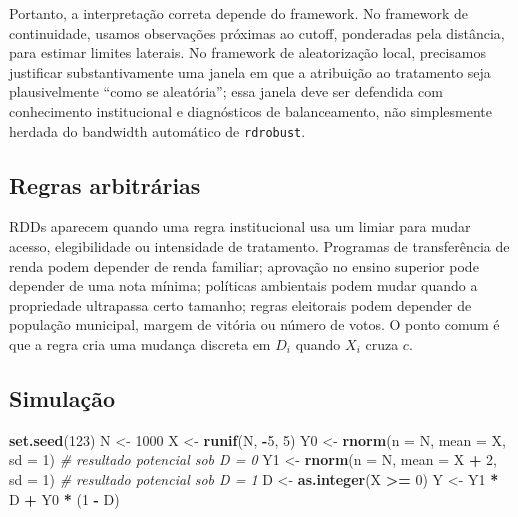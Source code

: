 \documentclass[
]{article}
\newenvironment{Shaded}{\begin{snugshade}}{\end{snugshade}}
\newcommand{\AttributeTok}[1]{\textcolor[rgb]{0.13,0.29,0.53}{#1}}
\newcommand{\CommentTok}[1]{\textcolor[rgb]{0.56,0.35,0.01}{\textit{#1}}}
\newcommand{\DecValTok}[1]{\textcolor[rgb]{0.00,0.00,0.81}{#1}}
\newcommand{\FunctionTok}[1]{\textcolor[rgb]{0.13,0.29,0.53}{\textbf{#1}}}
\newcommand{\NormalTok}[1]{#1}
\newcommand{\OtherTok}[1]{\textcolor[rgb]{0.56,0.35,0.01}{#1}}
\newcommand{\SpecialCharTok}[1]{\textcolor[rgb]{0.81,0.36,0.00}{\textbf{#1}}}
\begin{document}
Portanto, a interpretação correta depende do framework. No framework de continuidade, usamos observações próximas ao cutoff, ponderadas pela distância, para estimar limites laterais. No framework de aleatorização local, precisamos justificar substantivamente uma janela em que a atribuição ao tratamento seja plausivelmente ``como se aleatória''; essa janela deve ser defendida com conhecimento institucional e diagnósticos de balanceamento, não simplesmente herdada do bandwidth automático de \texttt{rdrobust}.

\subsection{Regras arbitrárias}\label{regras-arbitruxe1rias}

RDDs aparecem quando uma regra institucional usa um limiar para mudar acesso, elegibilidade ou intensidade de tratamento. Programas de transferência de renda podem depender de renda familiar; aprovação no ensino superior pode depender de uma nota mínima; políticas ambientais podem mudar quando a propriedade ultrapassa certo tamanho; regras eleitorais podem depender de população municipal, margem de vitória ou número de votos. O ponto comum é que a regra cria uma mudança discreta em \(D_i\) quando \(X_i\) cruza \(c\).

\subsection{Simulação}\label{simulauxe7uxe3o}

\begin{Shaded}
\begin{Highlighting}[]
\FunctionTok{set.seed}\NormalTok{(}\DecValTok{123}\NormalTok{)}
\NormalTok{N }\OtherTok{\textless{}{-}} \DecValTok{1000}
\NormalTok{X }\OtherTok{\textless{}{-}} \FunctionTok{runif}\NormalTok{(N, }\SpecialCharTok{{-}}\DecValTok{5}\NormalTok{, }\DecValTok{5}\NormalTok{)}
\NormalTok{Y0 }\OtherTok{\textless{}{-}} \FunctionTok{rnorm}\NormalTok{(}\AttributeTok{n =}\NormalTok{ N, }\AttributeTok{mean =}\NormalTok{ X, }\AttributeTok{sd =} \DecValTok{1}\NormalTok{)       }\CommentTok{\# resultado potencial sob D = 0}
\NormalTok{Y1 }\OtherTok{\textless{}{-}} \FunctionTok{rnorm}\NormalTok{(}\AttributeTok{n =}\NormalTok{ N, }\AttributeTok{mean =}\NormalTok{ X }\SpecialCharTok{+} \DecValTok{2}\NormalTok{, }\AttributeTok{sd =} \DecValTok{1}\NormalTok{)   }\CommentTok{\# resultado potencial sob D = 1}
\NormalTok{D }\OtherTok{\textless{}{-}} \FunctionTok{as.integer}\NormalTok{(X }\SpecialCharTok{\textgreater{}=} \DecValTok{0}\NormalTok{)}
\NormalTok{Y }\OtherTok{\textless{}{-}}\NormalTok{ Y1 }\SpecialCharTok{*}\NormalTok{ D }\SpecialCharTok{+}\NormalTok{ Y0 }\SpecialCharTok{*}\NormalTok{ (}\DecValTok{1} \SpecialCharTok{{-}}\NormalTok{ D)}
\end{Highlighting}
\end{Shaded}
\end{document}

